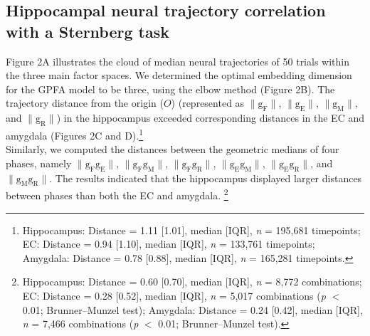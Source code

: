 \documentclass[final,3p,times,twocolumn]{elsarticle}
\begin{document}
\subsection{Hippocampal neural trajectory correlation with a Sternberg task}
Figure 2A illustrates the cloud of median neural trajectories of 50 trials within the three main factor spaces. We determined the optimal embedding dimension for the GPFA model to be three, using the elbow method (Figure 2B). The trajectory distance from the origin ($O$) (represented as $\mathrm{\lVert g_{F} \rVert}$, $\mathrm{\lVert g_{E} \rVert}$, $\mathrm{\lVert g_{M} \rVert}$, and $\mathrm{\lVert g_{R} \rVert}$) in the hippocampus exceeded corresponding distances in the EC and amygdala (Figures 2C and D).\footnote{Hippocampus: Distance = 1.11 [1.01], median [IQR], \textit{n} = 195,681 timepoints; EC: Distance = 0.94 [1.10], median [IQR], \textit{n} = 133,761 timepoints; Amygdala: Distance = 0.78 [0.88], median [IQR], \textit{n} = 165,281 timepoints.}
\\
\indent
Similarly, we computed the distances between the geometric medians of four phases, namely $\mathrm{\lVert g_{F}g_{E} \rVert}$, $\mathrm{\lVert g_{F}g_{M} \rVert}$, $\mathrm{\lVert g_{F}g_{R} \rVert}$, $\mathrm{\lVert g_{E}g_{M} \rVert}$, $\mathrm{\lVert g_{E}g_{R} \rVert}$, and $\mathrm{\lVert g_{M}g_{R} \rVert}$. The results indicated that the hippocampus displayed larger distances between phases than both the EC and amygdala. \footnote{Hippocampus: Distance = 0.60 [0.70], median [IQR], \textit{n} = 8,772 combinations; EC: Distance = 0.28 [0.52], median [IQR], \textit{n} = 5,017 combinations (\textit{p} $<$ 0.01; Brunner--Munzel test); Amygdala: Distance = 0.24 [0.42], median [IQR], \textit{n} = 7,466 combinations (\textit{p} $<$ 0.01; Brunner--Munzel test).}
\end{document}

